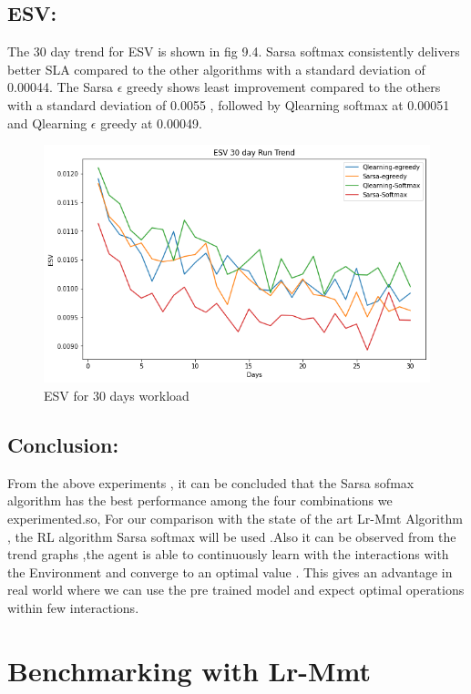 \documentclass[a4paper,12pt]{Classes/RoboticsLaTeX}
\begin{document}
         \section{ESV:}
         The 30 day trend for ESV  is shown in fig 9.4. Sarsa softmax consistently delivers  better SLA compared to the other algorithms  with a standard deviation of 0.00044. The Sarsa $\epsilon$ greedy  shows least improvement compared to the others  with a standard deviation of 0.0055 , followed by Qlearning softmax at 0.00051 and Qlearning $\epsilon$ greedy at 0.00049.

         \begin{figure}[H]
             \centering
             \includegraphics[width=1\linewidth]{Figures/ESV_30day_Convergence.png}
             \caption{ESV for 30 days workload}
             \label{fig:enter-label}
         \end{figure}

         \section{Conclusion:}
         From the above experiments , it can be  concluded that the Sarsa sofmax algorithm has the best performance among the four combinations we experimented.so,  For our comparison with the state of the art Lr-Mmt Algorithm , the RL algorithm Sarsa softmax will be used .Also it can be observed from the trend graphs ,the agent is able to continuously learn  with the interactions with the  Environment and  converge to an optimal value . This gives an advantage in real world where we can use the pre trained model and expect optimal operations within few interactions.
	
	\chapter{Benchmarking with Lr-Mmt}
	\label{chap:benchmarking with lrmmt}
\end{document}

